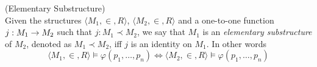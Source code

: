 \begin{definition}{(Elementary Substructure)}\label{def:elementary_substructure}\\
Given the structures $\langle M_1, \in, R \rangle$, $\langle M_2, \in, R \rangle$ and a one-to-one function $j: M_1 \rightarrow M_2$ such that $j: M_1 \prec M_2$, we say that $M_1$ is an \emph{elementary substructure} of $M_2$, denoted as $M_1 \prec M_2$, iff $j$ is an identity on $M_1$. In other words
\begin{equation}
\langle M_1, \in, R \rangle \models \varphi(p_1, \ldots, p_n) \iff \langle M_2, \in, R \rangle  \models \varphi(p_1, \ldots, p_n)
\end{equation}
\end{definition}

